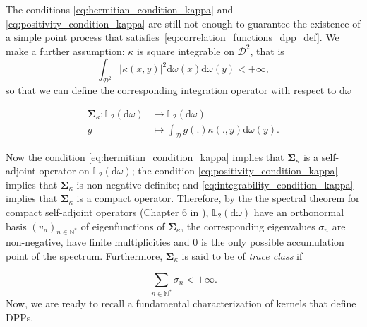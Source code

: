 \documentclass[twoside,11pt]{book}
\numberwithin{theorem}{chapter}
\numberwithin{definition}{chapter}
\numberwithin{proposition}{chapter}
\numberwithin{corollary}{chapter}
\numberwithin{example}{chapter}
\numberwithin{lemma}{chapter}
\numberwithin{assumption}{chapter}
\begin{document}
The conditions \eqref{eq:hermitian_condition_kappa} and \eqref{eq:positivity_condition_kappa} are still not enough to guarantee the existence of a simple point process that satisfies~\eqref{eq:correlation_functions_dpp_def}. 
 We make a further assumption: $\kappa$ is square integrable on $\mathcal{D}^{2}$, that is 
\begin{equation}\label{eq:integrability_condition_kappa}
\int_{\mathcal{D}^{2}} |\kappa(x,y)|^{2} \mathrm{d}\omega(x) \mathrm{d}\omega(y) < +\infty,
\end{equation}
so that we can define the corresponding integration operator with respect to $\mathrm{d}\omega$



\begin{align}
  \bm{\Sigma}_{\kappa} : \mathbb{L}_{2}(\mathrm{d}\omega) & \rightarrow \mathbb{L}_{2}(\mathrm{d}\omega) \nonumber \\
  g & \mapsto \int_{\mathcal{D}}g(.) \kappa(.,y) \mathrm{d}\omega(y). \nonumber
\end{align}

Now the condition \eqref{eq:hermitian_condition_kappa} implies that $\bm{\Sigma}_{\kappa}$ is a self-adjoint operator on $\mathbb{L}_{2}(\mathrm{d}\omega)$; the condition \eqref{eq:positivity_condition_kappa} implies that $\bm{\Sigma}_{\kappa}$ is non-negative definite; and \eqref{eq:integrability_condition_kappa} implies that $\bm{\Sigma}_{\kappa}$ is a compact operator. Therefore, by the the spectral theorem for compact self-adjoint operators (Chapter 6 in \citep{Bre10}), $\mathbb{L}_{2}(\mathrm{d}\omega)$ have an orthonormal basis $(v_{n})_{n \in \mathbb{N}^{*}}$ of eigenfunctions of $\bm{\Sigma}_{\kappa}$, the corresponding eigenvalues $\sigma_n$ are non-negative, have finite multiplicities and $0$ is the only possible accumulation point of the spectrum. Furthermore, $\bm{\Sigma}_{\kappa}$ is said to be of \emph{trace class} if

\begin{equation}\label{eq:traceclass_condition_kappa}
\sum\limits_{n \in \mathbb{N}^{*}} \sigma_n <+\infty.
\end{equation}
Now, we are ready to recall a fundamental characterization of kernels that define DPPs.

\end{document}
